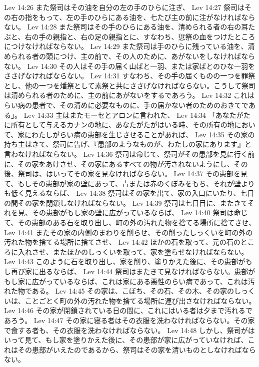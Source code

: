 Lev 14:26  また祭司はその油を自分の左の手のひらに注ぎ、
Lev 14:27  祭司はその右の指をもって、左の手のひらにある油を、七たび主の前に注がなければならない。
Lev 14:28  また祭司はその手のひらにある油を、清められる者の右の耳たぶと、右の手の親指と、右の足の親指とに、すなわち、愆祭の血をつけたところにつけなければならない。
Lev 14:29  また祭司は手のひらに残っている油を、清められる者の頭につけ、主の前で、その人のために、あがないをしなければならない。
Lev 14:30  その人はその手の届く山ばと一羽、または家ばとのひな一羽をささげなければならない。
Lev 14:31  すなわち、その手の届くものの一つを罪祭とし、他の一つを燔祭として素祭と共にささげなければならない。こうして祭司は清められる者のために、主の前にあがないをするであろう。
Lev 14:32  これはらい病の患者で、その清めに必要なものに、手の届かない者のためのおきてである」。
Lev 14:33  主はまたモーセとアロンに言われた、
Lev 14:34  「あなたがたに所有として与えるカナンの地に、あなたがたがはいる時、その所有の地において、家にわたしがらい病の患部を生じさせることがあれば、
Lev 14:35  その家の持ち主はきて、祭司に告げ、『患部のようなものが、わたしの家にあります』と言わなければならない。
Lev 14:36  祭司は命じて、祭司がその患部を見に行く前に、その家をあけさせ、その家にあるすべての物が汚されないようにし、その後、祭司は、はいってその家を見なければならない。
Lev 14:37  その患部を見て、もしその患部が家の壁にあって、青または赤のくぼみをもち、それが壁よりも低く見えるならば、
Lev 14:38  祭司はその家を出て、家の入口にいたり、七日の間その家を閉鎖しなければならない。
Lev 14:39  祭司は七日目に、またきてそれを見、その患部がもし家の壁に広がっているならば、
Lev 14:40  祭司は命じて、その患部のある石を取り出し、町の外の汚れた物を捨てる場所に捨てさせ、
Lev 14:41  またその家の内側のまわりを削らせ、その削ったしっくいを町の外の汚れた物を捨てる場所に捨てさせ、
Lev 14:42  ほかの石を取って、元の石のところに入れさせ、またほかのしっくいを取って、家を塗らせなければならない。
Lev 14:43  このように石を取り出し、家を削り、塗りかえた後に、その患部がもし再び家に出るならば、
Lev 14:44  祭司はまたきて見なければならない。患部がもし家に広がっているならば、これは家にある悪性のらい病であって、これは汚れた物である。
Lev 14:45  その家は、こぼち、その石、その木、その家のしっくいは、ことごとく町の外の汚れた物を捨てる場所に運び出さなければならない。
Lev 14:46  その家が閉鎖されている日の間に、これにはいる者は夕まで汚れるであろう。
Lev 14:47  その家に寝る者はその衣服を洗わなければならない。その家で食する者も、その衣服を洗わなければならない。
Lev 14:48  しかし、祭司がはいって見て、もし家を塗りかえた後に、その患部が家に広がっていなければ、これはその患部がいえたのであるから、祭司はその家を清いものとしなければならない。
